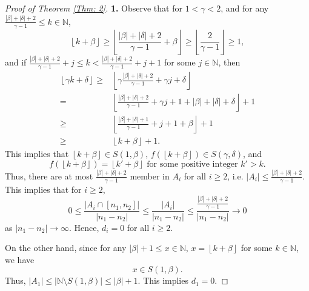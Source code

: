 \documentclass{amsart}
\theoremstyle{definition}
\numberwithin{equation}{section}%
\begin{document}
\begin{proof}[Proof of Theorem \ref{Thm: 2}]
\item[\bf 1.] Observe that for $1<\gamma<2$, and for any $\frac{|\beta|+|\delta|+2}{\gamma-1}\leq k \in \mathbb{N}$, 
\begin{equation*}
    \left\lfloor k+\beta \right\rfloor\geq \left\lfloor \frac{|\beta|+|\delta|+2}{\gamma-1}+\beta \right\rfloor\geq  \left\lfloor \frac{2}{\gamma-1} \right\rfloor\geq 1,
\end{equation*}
and if $\frac{|\beta|+|\delta|+2}{\gamma-1}+j\leq k < \frac{|\beta|+|\delta|+2}{\gamma-1}+j+1$ for some $j\in \mathbb{N}$, then
\begin{align*}
     \left\lfloor \gamma k+\delta \right\rfloor\geq&  \left\lfloor \gamma \frac{|\beta|+|\delta|+2}{\gamma-1}+\gamma j+\delta \right\rfloor\\
     =&\left\lfloor \frac{|\beta|+|\delta|+2}{\gamma-1}+\gamma j+1+|\beta|+|\delta|+\delta \right\rfloor+1\\
     \geq &\left\lfloor \frac{|\beta|+|\delta|+1}{\gamma-1}+j+1+\beta\right\rfloor+1\\
     \geq &\left\lfloor k+\beta \right\rfloor+1.
\end{align*}
This implies that $\left\lfloor k+\beta \right\rfloor\in S(1,\beta)$, $f(\left\lfloor k+\beta \right\rfloor)\in S(\gamma, \delta)$, and 
\begin{equation}\label{pfthm2-1-1}
    f(\left\lfloor k+\beta \right\rfloor)=\left\lfloor k'+\beta \right\rfloor\mbox{ for some positive integer }k'>k.
\end{equation}
Thus, there are at most $\frac{|\beta|+|\delta|+2}{\gamma-1}$ member in $A_i$ for all $i\geq 2$, i.e. $|A_i|\leq \frac{|\beta|+|\delta|+2}{\gamma-1}$. This implies that for $i\geq 2$, 
\begin{equation*}
    0\leq \frac{|A_i\cap [n_1, n_2]|}{|n_1-n_2|}\leq \frac{|A_i|}{|n_1-n_2|}\leq \frac{\frac{|\beta|+|\delta|+2}{\gamma-1}}{|n_1-n_2|}\to 0
\end{equation*}
as $|n_1-n_2|\to \infty$. Hence, $d_i=0$ for all $i\geq 2$. 

On the other hand, since for any $|\beta|+1\leq x\in \mathbb{N}$, $x=\left\lfloor k+\beta\right\rfloor$ for some $k\in\mathbb{N}$, we have 
\begin{equation}\label{pfthm2-1-3}
    x\in S(1,\beta).
\end{equation}
Thus, $|A_1|\leq |\mathbb{N}\setminus S(1,\beta)|\leq |\beta|+1$. This implies $d_1=0$.


\end{proof}
\end{document}

